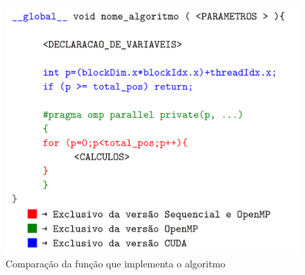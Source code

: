 \begin{figure}[H]
\centering
\includegraphics[]{Imagens/comparacao_codigo/comparacao_codigo_padrao.png}
\caption{Comparação da função que implementa o algoritmo}
\label{fig:comparacao_codigo_padrao}
\end{figure}
